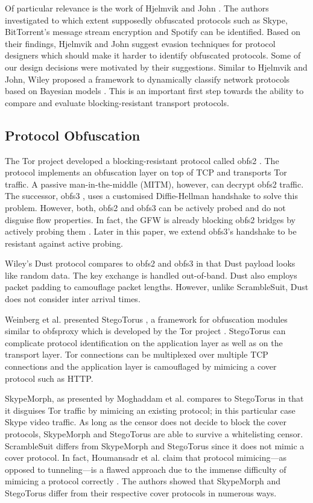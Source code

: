 \documentclass{sig-alternate}
\newcommand{\pt}{\textsf{ScrambleSuit}}
\numberwithin{enumi}{section}
\numberwithin{notesctr}{section}
\begin{document}
Of particular relevance is the work of Hjelmvik and John \cite{Hjelmvik2010}. The authors
investigated to which extent supposedly obfuscated protocols such as Skype, BitTorrent's message
stream encryption and Spotify can be identified. Based on their findings, Hjelmvik and John suggest
evasion techniques for protocol designers which should make it harder to identify obfuscated
protocols. Some of our design decisions were motivated by their suggestions.
Similar to Hjelmvik and John, Wiley proposed a framework to dynamically classify network protocols
based on Bayesian models \cite{Wiley2011b}. This is an important first step towards the ability to
compare and evaluate blocking-resistant transport protocols.

\subsection{Protocol Obfuscation} The Tor project developed a blocking-resistant protocol called obfs2
\cite{obfs2}. The protocol implements an obfuscation layer on top of TCP and transports Tor traffic.
A passive man-in-the-middle (MITM), however, can decrypt obfs2 traffic. The successor, obfs3
\cite{obfs3}, uses a customised Diffie-Hellman handshake to solve this problem. However, both, obfs2
and obfs3 can be actively probed and do not disguise flow properties. In fact, the GFW is already
blocking obfs2 bridges by actively probing them \cite{obfs2probe}. Later in this paper, we extend
obfs3's handshake to be resistant against active probing.

Wiley's Dust protocol \cite{Wiley2011} compares to obfs2 and obfs3 in that Dust payload looks like
random data. The key exchange is handled out-of-band.  Dust also employs packet padding to
camouflage packet lengths. However, unlike \pt{}, Dust does not consider inter arrival times.


Weinberg et al. presented StegoTorus \cite{Weinberg2012}, a framework for obfuscation modules
similar to obfsproxy which is developed by the Tor project \cite{obfsproxy}. StegoTorus can
complicate protocol identification on the application layer as well as on the transport layer. Tor
connections can be multiplexed over multiple TCP connections and the application layer is
camouflaged by mimicing a cover protocol such as HTTP.

SkypeMorph, as presented by Moghaddam et al. \cite{Moghaddam2012} compares to StegoTorus in that it
disguises Tor traffic by mimicing an existing protocol; in this particular case Skype video traffic.
As long as the censor does not decide to block the cover protocols, SkypeMorph and StegoTorus are
able to survive a whitelisting censor. \pt{} differs from SkypeMorph and StegoTorus since it does
not mimic a cover protocol. In fact, Houmansadr et al. claim  that protocol mimicing---as opposed to
tunneling---is a flawed approach due to the immense difficulty of mimicing a protocol correctly
\cite{Houmansadr2013b}. The authors showed that SkypeMorph and StegoTorus differ from their
respective cover protocols in numerous ways.
\end{document}
